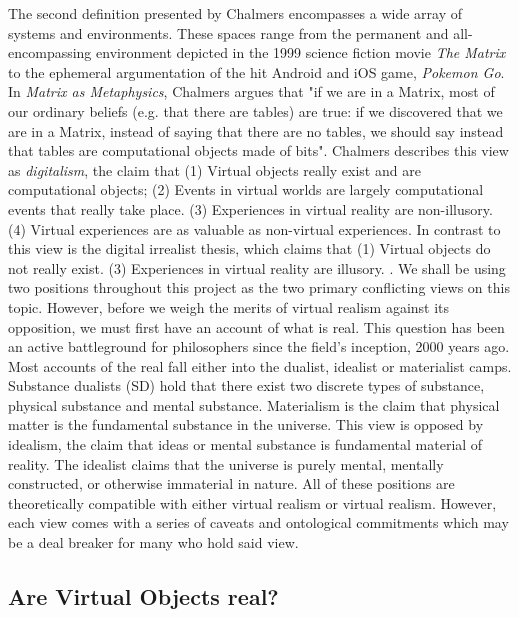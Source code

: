 The second definition presented by Chalmers encompasses a wide array of systems and environments. These spaces range from the permanent and all-encompassing environment depicted in the 1999 science fiction movie \textit{The Matrix} to the ephemeral argumentation of the hit Android and iOS game, \textit{Pokemon Go}. In \textit{Matrix as Metaphysics}, Chalmers argues that "if we are in a Matrix, most of our ordinary beliefs (e.g. that there are tables) are true: if we discovered that we are in a Matrix, instead of saying that there are no tables, we should say instead that tables are computational objects made of bits". Chalmers describes this view as \textit{digitalism}, the claim that (1) Virtual objects really exist and are computational objects;
(2) Events in virtual worlds are largely computational events that really take place. (3) Experiences in virtual reality are non-illusory.
(4) Virtual experiences are as valuable as non-virtual experiences. In contrast to this view is the digital irrealist thesis, which claims that (1) Virtual objects do not really exist. (3) Experiences in virtual reality are illusory. \cite{ChalmersVR}. We shall be using two positions throughout this project as the two primary conflicting views on this topic. However, before we weigh the merits of virtual realism against its opposition, we must first have an account of what is real. This question has been an active battleground for philosophers since the field's inception, 2000 years ago. Most accounts of the real fall either into the dualist, idealist or materialist camps. Substance dualists (SD) hold that there exist two discrete types of substance, physical substance and mental substance.  Materialism is the claim that physical matter is the fundamental substance in the universe. This view is opposed by idealism, the claim that ideas or mental substance is fundamental material of reality. The idealist claims that the universe is purely mental, mentally constructed, or otherwise immaterial in nature. All of these positions are theoretically compatible with either virtual realism or virtual realism. However, each view comes with a series of caveats and ontological commitments which may be a deal breaker for many who hold said view. 




\subsection{Are Virtual Objects real?}
